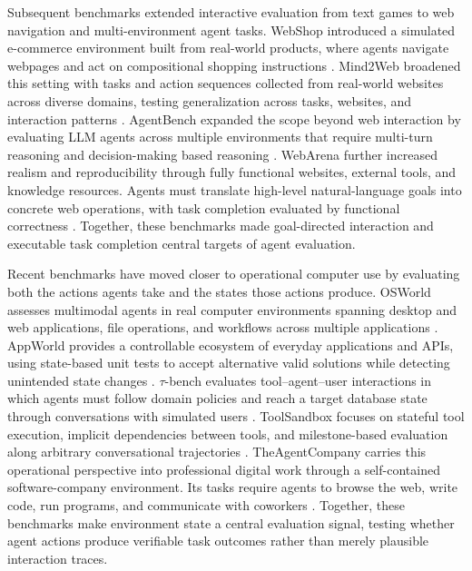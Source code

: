 \documentclass[pdflatex,sn-mathphys-num]{sn-jnl}%
\theoremstyle{thmstyleone}%
\theoremstyle{thmstyletwo}%
\theoremstyle{thmstylethree}%
\begin{document}
Subsequent benchmarks extended interactive evaluation from text games to web navigation and multi-environment agent tasks. WebShop introduced a simulated e-commerce environment built from real-world products, where agents navigate webpages and act on compositional shopping instructions \cite{yao2022webshop}. Mind2Web broadened this setting with tasks and action sequences collected from real-world websites across diverse domains, testing generalization across tasks, websites, and interaction patterns \cite{deng2023mind2web}. AgentBench expanded the scope beyond web interaction by evaluating LLM agents across multiple environments that require multi-turn reasoning and decision-making based reasoning \cite{liu2023agentbench}. WebArena further increased realism and reproducibility through fully functional websites, external tools, and knowledge resources. Agents must translate high-level natural-language goals into concrete web operations, with task completion evaluated by functional correctness \cite{zhou2023webarena}. Together, these benchmarks made goal-directed interaction and executable task completion central targets of agent evaluation.

Recent benchmarks have moved closer to operational computer use by evaluating both the actions agents take and the states those actions produce. OSWorld assesses multimodal agents in real computer environments spanning desktop and web applications, file operations, and workflows across multiple applications \cite{xie2024osworld}. AppWorld provides a controllable ecosystem of everyday applications and APIs, using state-based unit tests to accept alternative valid solutions while detecting unintended state changes \cite{trivedi2024appworld}. $\tau$-bench evaluates tool--agent--user interactions in which agents must follow domain policies and reach a target database state through conversations with simulated users \cite{yao2024bench}. ToolSandbox focuses on stateful tool execution, implicit dependencies between tools, and milestone-based evaluation along arbitrary conversational trajectories \cite{lu2024toolsandbox}. TheAgentCompany carries this operational perspective into professional digital work through a self-contained software-company environment. Its tasks require agents to browse the web, write code, run programs, and communicate with coworkers \cite{xu2024theagentcompany}. Together, these benchmarks make environment state a central evaluation signal, testing whether agent actions produce verifiable task outcomes rather than merely plausible interaction traces.
\end{document}
